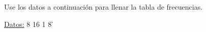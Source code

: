 \documentclass{cdplf-prueba}
\begin{document}
\subsection{}

Use los datos a continuación para llenar la tabla de frecuencias.

\underline{Datos:} \hspace{4pt} 8 \hspace{4pt}\textbullet\hspace{4pt} 16 \hspace{4pt}\textbullet\hspace{4pt} 1 \hspace{4pt}\textbullet\hspace{4pt} 8 \hspace{4pt}\textbullet\h
\end{document}
